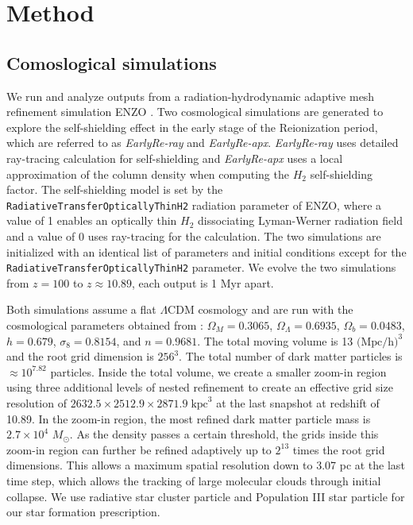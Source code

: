 \documentclass[linenumbers, twocolumn]{aastex631}
\newcommand{\acorr}[1]{\textbf{\textcolor{green}{#1}}}
\begin{document}


\section{Method} \label{sec:method}
\subsection{Comoslogical simulations}
We run and analyze outputs from a radiation-hydrodynamic adaptive mesh refinement simulation ENZO \citep{Bryan+2014}. Two cosmological simulations are generated to explore the self-shielding effect in the early stage of the Reionization period, which are referred to as \textit{EarlyRe-ray} and \textit{EarlyRe-apx}. \textit{EarlyRe-ray} uses detailed ray-tracing calculation for self-shielding and \textit{EarlyRe-apx} uses a local approximation of the column density when computing the $H_{2}$ self-shielding factor.  The self-shielding model is set by the \texttt{RadiativeTransferOpticallyThinH2} radiation parameter of ENZO, where a value of 1 enables an optically thin $H_{2}$ dissociating Lyman-Werner radiation field and a value of 0 uses ray-tracing for the calculation. The two simulations are initialized with an identical list of parameters and initial conditions except for the \texttt{RadiativeTransferOpticallyThinH2} parameter. We evolve the two simulations from $z = 100$ to $z \approx 10.89$, each output is 1 Myr apart.

Both simulations assume a flat $\Lambda$CDM cosmology and are run with the cosmological parameters obtained from \cite{PlanckCollaboration+2016}: $\Omega_{M} = 0.3065$, $\Omega_{\Lambda} = 0.6935$, $\Omega_{b} = 0.0483$, $h = 0.679$, $\sigma_{8} = 0.8154$, and $n = 0.9681$. The total moving volume is 13 $\text{(Mpc/h)}^{3}$ and the root grid dimension is $256^{3}$. The total number of dark matter particles is $\approx 10^{7.82}$ particles. Inside the total volume, we create a smaller zoom-in region using three additional levels of nested refinement to create an effective grid size resolution of $2632.5 \times 2512.9 \times 2871.9 \; \text{kpc}^{3}$ at the last snapshot at redshift of 10.89. In the zoom-in region, the most refined dark matter particle mass is $2.7\times 10^{4}$ $M_\odot$. As the density passes a certain threshold, the grids inside this zoom-in region can further be refined adaptively up to $2^{13}$ times the root grid dimensions. This allows a maximum spatial resolution down to 3.07 pc at the last time step, which allows the tracking of large molecular clouds through initial collapse. We use radiative star cluster particle \citep{Wise+2009} and Population III star particle \citep{Abel+2007} for our star formation prescription. 
\end{document}
